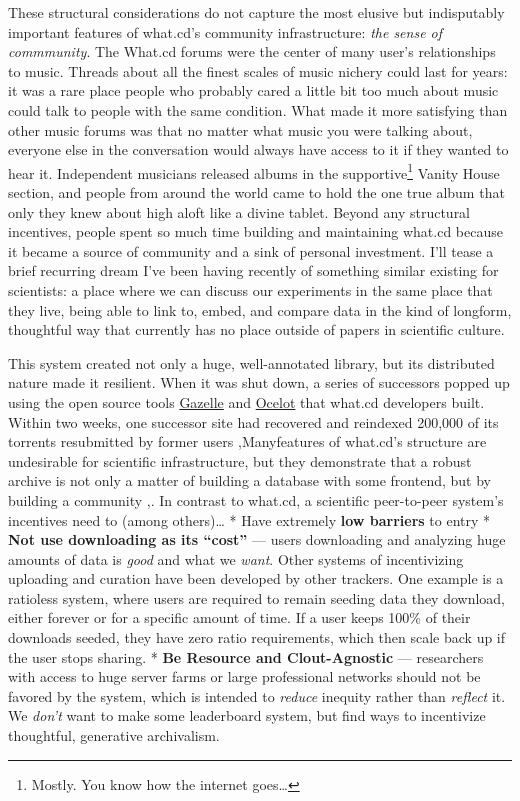 \documentclass{article}
\begin{document}
These structural considerations do not capture the most elusive but
indisputably important features of what.cd's community infrastructure:
\emph{the sense of commmunity}. The What.cd forums were the center of
many user's relationships to music. Threads about all the finest scales
of music nichery could last for years: it was a rare place people who
probably cared a little bit too much about music could talk to people
with the same condition. What made it more satisfying than other music
forums was that no matter what music you were talking about, everyone
else in the conversation would always have access to it if they wanted
to hear it. Independent musicians released albums in the
supportive\footnote{Mostly. You know how the internet goes\ldots{}}
Vanity House section, and people from around the world came to hold the
one true album that only they knew about high aloft like a divine
tablet. Beyond any structural incentives, people spent so much time
building and maintaining what.cd because it became a source of community
and a sink of personal investment. I'll tease a brief recurring dream
I've been having recently of something similar existing for scientists:
a place where we can discuss our experiments in the same place that they
live, being able to link to, embed, and compare data in the kind of
longform, thoughtful way that currently has no place outside of papers
in scientific culture.

This system created not only a huge, well-annotated library, but its
distributed nature made it resilient. When it was shut down, a series of
successors popped up using the open source tools
\href{https://github.com/WhatCD/Gazelle}{Gazelle} and
\href{https://github.com/WhatCD/Ocelot}{Ocelot} that what.cd developers
built. Within two weeks, one successor site had recovered and reindexed
200,000 of its torrents resubmitted by former users \cite{vandersarWhatCdDead2016},Manyfeatures of what.cd's structure are undesirable for scientific
infrastructure, but they demonstrate that a robust archive is not only a
matter of building a database with some frontend, but by building a
community \cite{brossCommunityCollaborationContribution2013},.
In contrast to what.cd, a scientific peer-to-peer system's incentives
need to (among others)\ldots{} * Have extremely \textbf{low barriers} to
entry * \textbf{Not use downloading as its ``cost''} --- users
downloading and analyzing huge amounts of data is \emph{good} and what
we \emph{want}. Other systems of incentivizing uploading and curation
have been developed by other trackers. One example is a ratioless
system, where users are required to remain seeding data they download,
either forever or for a specific amount of time. If a user keeps 100\%
of their downloads seeded, they have zero ratio requirements, which then
scale back up if the user stops sharing. * \textbf{Be Resource and
Clout-Agnostic} --- researchers with access to huge server farms or
large professional networks should not be favored by the system, which
is intended to \emph{reduce} inequity rather than \emph{reflect} it. We
\emph{don't} want to make some leaderboard system, but find ways to
incentivize thoughtful, generative archivalism.
\end{document}
